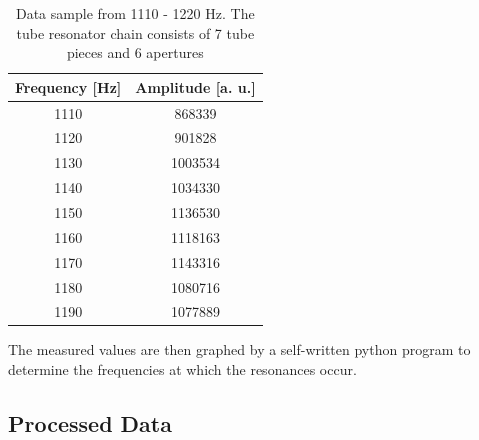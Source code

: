 \documentclass[12pt]{article}
\begin{document}
\begin{table}[hbt]
 \begin{center}
    \caption{Data sample from 1110 - 1220 Hz. The tube resonator chain consists of 7 tube pieces and 6 apertures}
    \label{tab:table4}
    \begin{tabular}{c c} 
      \hline 
     \textbf{Frequency [Hz]} & \textbf{Amplitude [a. u.]}\\
      \hline
      1110 & 868339 \\
     1120 & 901828 \\
      1130 & 1003534 \\
      1140 & 1034330 \\
      1150 & 1136530 \\
      1160 & 1118163 \\
     1170 & 1143316 \\
      1180 & 1080716 \\
      1190 & 1077889 \\
      \hline
    \end{tabular}
  \end{center}
\end{table}
The measured values are then graphed by a self-written python program to determine the frequencies at which the resonances occur.\subsection{Processed Data}
\end{document}
